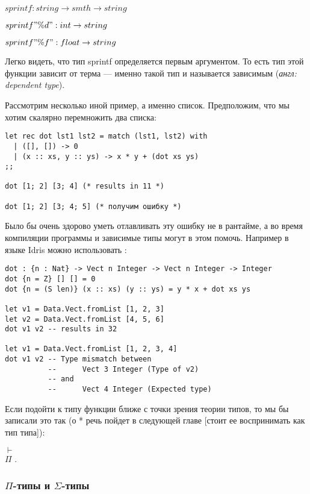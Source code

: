     $sprintf : string \rightarrow smth \rightarrow string$

    $sprintf "\%d" : int \rightarrow string$

    $sprintf "\%f" : float \rightarrow string$

Легко видеть, что тип sprintf определяется первым аргументом. То есть тип этой функции зависит от терма --- именно такой тип и называется зависимым (\textit{англ: dependent type}).

Рассмотрим несколько иной пример, а именно список. Предположим, что мы хотим скалярно перемножить два списка:

\begin{verbatim}
let rec dot lst1 lst2 = match (lst1, lst2) with
  | ([], []) -> 0
  | (x :: xs, y :: ys) -> x * y + (dot xs ys)
;;

dot [1; 2] [3; 4] (* results in 11 *)

dot [1; 2] [3; 4; 5] (* получим ошибку *)

\end{verbatim}

Было бы очень здорово уметь отлавливать эту ошибку не в рантайме, а во время
компиляции программы и зависимые типы могут в этом помочь. Например в языке
Idris можно использовать :

\begin{verbatim}
dot : {n : Nat} -> Vect n Integer -> Vect n Integer -> Integer
dot {n = Z} [] [] = 0
dot {n = (S len)} (x :: xs) (y :: ys) = y * x + dot xs ys

let v1 = Data.Vect.fromList [1, 2, 3]
let v2 = Data.Vect.fromList [4, 5, 6]
dot v1 v2 -- results in 32

let v1 = Data.Vect.fromList [1, 2, 3, 4]
dot v1 v2 -- Type mismatch between
          --      Vect 3 Integer (Type of v2)
          -- and
          --      Vect 4 Integer (Expected type)
\end{verbatim}

Если подойти к типу функции  ближе с точки зрения теории типов, то мы
бы записали это так (о * речь пойдет в следующей главе [стоит ее воспринимать
как тип типа]):

$\vdash$\\
$\Pi$  $.$ 

\subsubsection{$\Pi$-типы и $\Sigma$-типы}

